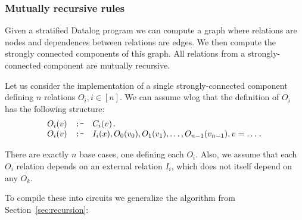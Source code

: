 \subsubsection{Mutually recursive rules}\label{sec:mutually-recursive}

Given a stratified Datalog program we can compute a graph where relations are nodes and dependences
between relations are edges.  We then compute the strongly connected components of this graph.
All relations from a strongly-connected component are mutually recursive.

Let us consider the implementation of a single strongly-connected component defining $n$
relations $O_i, i \in [n]$.  We can assume wlog that the definition of $O_i$ has the following
structure:
\newcommand{\tns}{\code{:-}}
\newcommand{\cd}{\code{.}}
$$
\begin{array}{lll}
O_i(v) &\tns& C_i(v)\cd \\
O_i(v) &\tns&  I_i(x), O_0(v_0), O_1(v_1), \ldots, O_{n-1}(v_{n-1}), v = \ldots \cd \\
\end{array}
$$

There are exactly $n$ base cases, one defining each $O_i$.  Also, we assume that each $O_i$ relation
depends on an external relation $I_i$, which does not itself depend on any $O_k$. 

To compile these into circuits we generalize the algorithm from Section~\ref{sec:recursion}:

